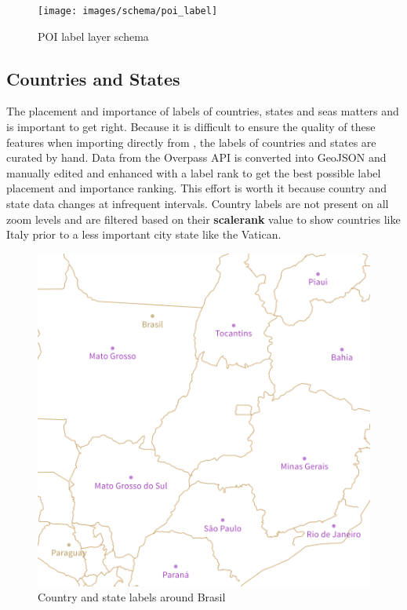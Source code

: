 \vspace{20pt}
\begin{figure}[h]
  \centering
  \texttt{[image: images/schema/poi\_label]}
  \caption{POI label layer schema}
\end{figure}

\subsection{Countries and States}

\noindent\begin{minipage}[t]{0.48\linewidth}
    \vspace{0pt}
    The placement and importance of labels of countries, states and seas matters\cite{12_axismaps.github.io_2015} and is important to get right. 
    Because it is difficult to ensure the quality of these features when importing directly from \osm{}, the labels of countries and states are curated by hand.
    Data from the Overpass API \cite{13_wiki.openstreetmap.org_2015} is converted into GeoJSON and manually edited and enhanced with a label rank to get the best possible label placement and importance ranking.
    This effort is worth it because country and state data changes
    at infrequent intervals.
    Country labels are not present on all zoom levels and are filtered based
    on their \textbf{scalerank} value to show countries like Italy prior to a less important city state like the Vatican.
\end{minipage}
\hfill
\begin{minipage}[t]{0.48\linewidth}
    \vspace{0pt}
    \begin{figure}[H]
        \includegraphics[width=\textwidth]{images/schema/country_state_label_example}
        \caption{Country and state labels around Brasil}
    \end{figure}
\end{minipage}


